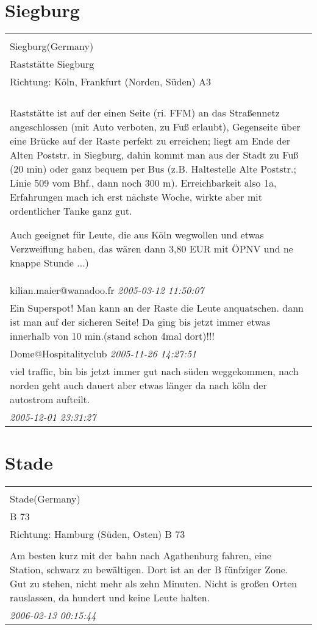 \documentclass[a4paper,12pt]{article}
\begin{document}
\section{Siegburg}
\begin{tabular}{|p{13cm}|}
\hline\\
Siegburg(Germany)\\
Raststätte Siegburg\\
Richtung: Köln, Frankfurt (Norden, Süden) A3 \\
\hline\\
Raststätte ist auf der einen Seite (ri. FFM) an das Straßennetz angeschlossen (mit Auto verboten, zu Fuß erlaubt), Gegenseite über eine Brücke auf der Raste perfekt zu erreichen; liegt am Ende der Alten Poststr. in Siegburg, dahin kommt man aus der Stadt zu Fuß (20 min) oder ganz bequem per Bus (z.B. Haltestelle Alte Poststr.; Linie 509 vom Bhf., dann noch 300 m).
Erreichbarkeit also 1a, Erfahrungen mach ich erst nächste Woche, wirkte aber mit ordentlicher Tanke ganz gut.

Auch geeignet für Leute, die aus Köln wegwollen und etwas Verzweiflung haben, das wären dann 3,80 EUR mit ÖPNV und ne knappe Stunde ...) \\
kilian.maier@wanadoo.fr \textit{ 2005-03-12 11:50:07 }\\\hline Ein Superspot! Man kann an der Raste die Leute anquatschen. dann ist man auf der sicheren Seite! Da ging bis jetzt immer etwas innerhalb von 10 min.(stand schon 4mal dort)!!! \\
Dome@Hospitalityclub \textit{ 2005-11-26 14:27:51 }\\\hline viel traffic, bin bis jetzt immer gut nach süden weggekommen, nach norden geht auch dauert aber etwas länger da nach köln der autostrom aufteilt. \\
\textit{ 2005-12-01 23:31:27 }\\\hline
\end{tabular}


\section{Stade}
\begin{tabular}{|p{13cm}|}
\hline\\
Stade(Germany)\\
B 73\\
Richtung: Hamburg (Süden, Osten) B 73 \\
\hline\\
Am besten kurz mit der bahn nach Agathenburg fahren, eine Station, schwarz zu bewältigen. Dort ist an der B fünfziger Zone. Gut zu stehen, nicht mehr als zehn Minuten. Nicht is großen Orten rauslassen, da hundert und keine Leute halten. \\
\textit{ 2006-02-13 00:15:44 }\\\hline
\end{tabular}
\end{document}
